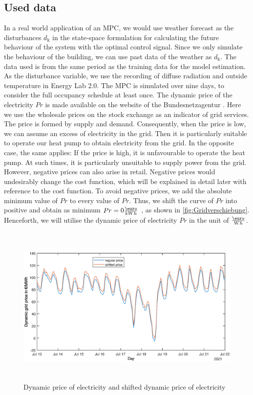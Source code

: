 \subsection{Used data}
\label{subsec:PastData}
    In a real world application of an MPC, we would use weather forecast as the disturbances $d_\text{k}$ in the state-space formulation for calculating the future behaviour of the system with the optimal control signal. Since we only simulate the behaviour of the building, we can use past data of the weather as $d_\text{k}$.\newline
    The data used is from the same period as the training data for the model estimation. As the disturbance variable, we use the recording of diffuse radiation and outside temperature in Energy Lab 2.0. The MPC is simulated over nine days, to consider the full occupancy schedule at least once.\newline
    The dynamic price of the electricity  $Pr$ is made available on the website of the Bundesnetzagentur \cite{Bundesnetzagentur-smard}. Here we use the wholesale prices on the stock exchange as an indicator of grid services. The price is formed by supply and demand. Consequently, when the price is low, we can assume an excess of electricity in the grid. Then it is particularly suitable to operate our heat pump to obtain electricity from the grid. In the opposite case, the same applies: If the price is high, it is unfavourable to operate the heat pump. At such times, it is particularly unsuitable to supply power from the grid. \newline
    However, negative prices can also arise in retail. Negative prices would undesirably change the cost function, which will be explained in detail later with reference to the cost function. To avoid negative prices, we add the absolute minimum value of $Pr$ to every value of $Pr$. Thus, we shift the curve of $Pr$ into positive and obtain as minimum $Pr = 0 \frac{\text{\euro}}{kWh}$ , as shown in \autoref{fig:Gridverschiebung}. Henceforth, we will utilise the dynamic price of electricity $Pr$ in the unit of $\frac{\text{\euro}}{Wh}$.
    \begin{figure}[h]
            \centering
            \includegraphics[width=15cm,height=8cm]{figure/Grid_data_Verschiebung.eps}
           \caption{Dynamic price of electricity \cite{Bundesnetzagentur-smard} and shifted dynamic price of electricity}
            \label{fig:Gridverschiebung}
    \end{figure}
    
